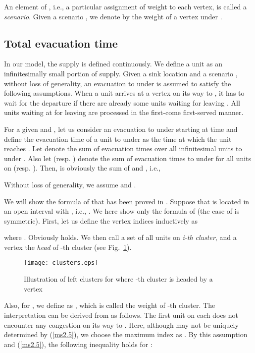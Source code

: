\documentclass[a4paper]{llncs}
\begin{document}
An element of , i.e., a particular assignment of weight to each vertex, is called a {\it scenario}.
Given a scenario , we denote by  the weight of a vertex  under .


\subsection{Total evacuation time}
\label{subsec:to}
In our model, the supply is defined continuously.
We define a unit as an infinitesimally small portion of supply.
Given a sink location  and a scenario , 
without loss of generality, an evacuation to  under  is assumed to satisfy the following assumptions.
When a unit arrives at a vertex  on its way to , it has to wait for the departure if there are already some units waiting for leaving . 
All units waiting at  for leaving  are processed in the first-come first-served manner. 

For a given  and , let us consider an evacuation to  under  starting at time 
and define the evacuation time of a unit to  under  as the time at which the unit reaches .
Let  denote the sum of evacuation times over all infinitesimal units to  under .
Also let  (resp. ) denote the sum of evacuation times to  under  for all units on  (resp. ).
Then,  is obviously the sum of  and , i.e., 

Without loss of generality, we assume  and .

We will show the formula of  that has been proved in \cite{hgk14_2,hgk14_4}.
Suppose that  is located in an open interval  with , i.e., .
We here show only the formula of  (the case of  is symmetric).
First, let us define the vertex indices  inductively as

where .
Obviously  holds.
We then call a set of all units on  {\it i-th cluster},
and a vertex  the {\it head} of -th cluster (see Fig.~\ref{fig:cl}).
\begin{figure}[b]
\centering
\texttt{[image: clusters.eps]} 
\caption{Illustration of left clusters for  where -th cluster is headed by a vertex }
\label{fig:cl}
\end{figure}

\noindent
Also, for , we define  as ,
which is called the weight of -th cluster.
The interpretation can be derived from \cite{hgk14_2,hgk14_4} as follows.
The first unit on each  does not encounter any congestion on its way to . 
Here, although  may not be uniquely determined by (\ref{ms2.5}),
we choose the maximum index as .
By this assumption and (\ref{ms2.5}), the following inequality holds for :
\end{document}
